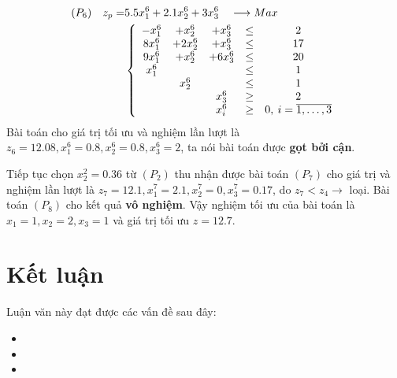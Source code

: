 \documentclass[12pt,a4paper]{report}
\begin{document}
    \begin{equation*}
      \begin{split}
          (P_6) \quad z_p= & 5.5x^6_1 + 2.1x^6_2 + 3x^6_3 \quad \longrightarrow Max \\
          & \left\{\begin{array} {ccccc}
           -x^6_1 &+ x^6_2 &+ x^6_3 &\leq& 2 \\
           8x^6_1 &+ 2x^6_2 &+ x^6_3&\leq &17 \\
           9x^6_1 &+ x^6_2 &+ 6x^6_3 &\leq& 20 \\
           x^6_1&& &\leq& 1 \\
           &x^6_2& &\leq& 1 \\
           &&x^6_3& \geq &2 \\
          &&x^6_i &\geq &0 , \: i=\overline{\rm 1, \ldots ,3} \\
          \end{array}\right. \\
      \end{split}
    \end{equation*}
    Bài toán cho giá trị tối ưu và nghiệm lần lượt là  $z_6=12.08, x^6_1=0.8, x^6_2=0.8, x^6_3=2$, ta nói bài toán được \textbf{gọt bởi cận}.
    
Tiếp tục chọn $x^2_2=0.36$ từ $(P_2)$ thu nhận được bài toán $(P_7)$ cho giá trị và nghiệm lần lượt là $z_7=12.1, x^7_1=2.1, x^7_2=0, x^7_3=0.17$, do $z_7<z_4 \rightarrow$ loại. Bài toán $(P_8)$ cho kết quả \textbf{vô nghiệm}. Vậy nghiệm tối ưu của bài toán là $x_1=1, x_2=2, x_3=1$ và giá trị tối ưu $z=12.7$.
        
\chapter*{Kết luận}                         %
\indent
\thispagestyle{fancy}

Luận văn này đạt được các vấn đề sau đây:

\begin{itemize}
	\item 
	\item 
	\item
\end{itemize}
\end{document}
